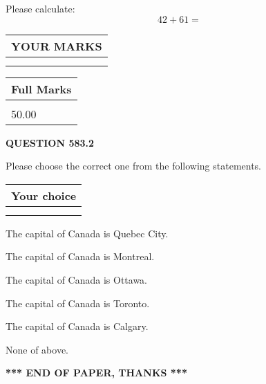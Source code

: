 \documentclass[12pt]{article}
\begin{document}
  
 
Please calculate:
\begin{equation}
42 +  %
61 = \nonumber
\end{equation}
 

 

 
  
\vspace{0.2in}
  
\noindent\begin{tabular}{|l|}
\hline
 YOUR MARKS  \\
\hline
 \\ 
 \\ 
\hline
\end{tabular}
\hspace{0.05in} \begin{tabular}{|l|}
\hline
 Full Marks  \\
\hline
 \\ 
50.00 \\
\hline
\end{tabular}
{\textbf{\Large{QUESTION
583.2 
}}}
  
  
Please choose the correct one from the following statements.
  
  
\noindent\hspace{3.0in} \begin{tabular}{|l|}
\hline
Your choice \\
\hline
 \\ 
 \\ 
\hline
\end{tabular}
  
  
 
 
The capital of Canada is Quebec City.
 
 
The capital of Canada is Montreal.
 
 
The capital of Canada is Ottawa.
 
 
The capital of Canada is Toronto.
 
 
The capital of Canada is Calgary.
 
 
 None of above.
 
 
   
   
 \vspace{0.2in}
 
   
   
   
   
\vspace{1.0in} 
{\textbf{\large{ *** END OF PAPER, THANKS *** }}} 
   
\end{document}

